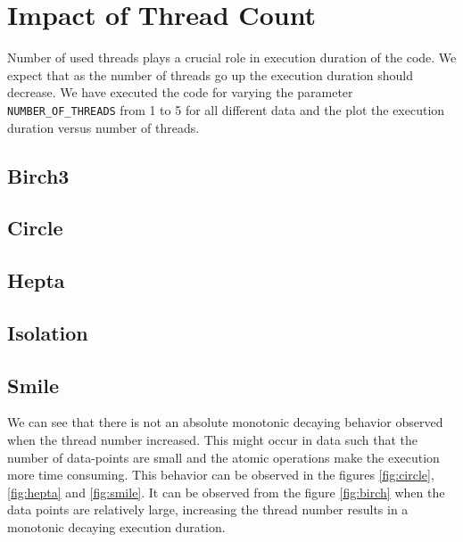\section{Impact of Thread Count}
Number of used threads plays a crucial role in execution duration of the code. We expect that as the number of threads go up the execution duration should decrease. We have executed the code for varying the parameter \texttt{NUMBER\_OF\_THREADS} from 1 to 5 for all different data and the plot the execution duration versus number of threads. 

\subsection{Birch3}


\subsection{Circle}


\subsection{Hepta}


\subsection{Isolation}


\subsection{Smile}


We can see that there is not an absolute monotonic decaying behavior observed when the thread number increased. This might occur in data such that the number of data-points are small and the atomic operations make the execution more time consuming. This behavior can be observed in the figures \ref{fig:circle}, \ref{fig:hepta} and \ref{fig:smile}. It can be observed from the figure \ref{fig:birch} when the data points are relatively large, increasing the thread number results in a monotonic decaying execution duration. 

